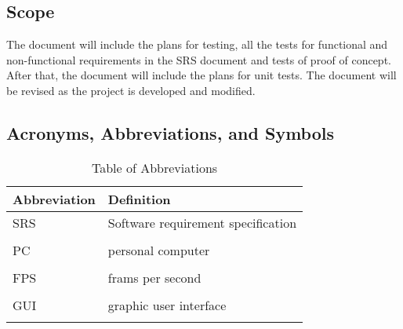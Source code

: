 \documentclass[12pt]{article}
\begin{document}
\subsection{Scope}
The document will include the plans for testing, all the tests for functional and non-functional requirements in the SRS document and tests of proof of concept. After that, the document will include the plans for unit tests. The document will be revised as the project is developed and modified.
\subsection{Acronyms, Abbreviations, and Symbols}
\begin{table}[htp]
\caption{Table of Abbreviations} \label{Table}

\begin{tabularx}{\textwidth}{p{3cm}X}
\toprule
\textbf{Abbreviation} & \textbf{Definition} \\
\midrule
SRS & Software requirement specification\\\\
PC & personal computer\\\\
FPS & frams per second\\\\
GUI & graphic user interface\\\\
\bottomrule
\end{tabularx}
\end{table}
\end{document}

